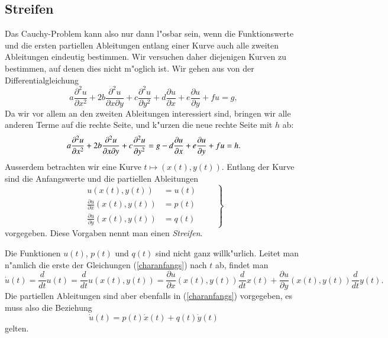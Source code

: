 \subsection{Streifen}
Das Cauchy-Problem kann also nur dann l"osbar sein, wenn die Funktionswerte
und die ersten partiellen Ableitungen entlang einer Kurve
auch alle zweiten Ableitungen eindeutig bestimmen.
Wir versuchen daher
diejenigen Kurven zu bestimmen, auf denen dies nicht m"oglich ist.
Wir gehen aus von der Differentialgleichung
\begin{equation}
a\frac{\partial^2 u}{\partial x^2}
+
2b\frac{\partial^2 u}{\partial x\partial y}
+
c\frac{\partial^2 u}{\partial y^2}
+
d\frac{\partial u}{\partial x}
+
e\frac{\partial u}{\partial y}
+
fu
=g,
\label{charequation}
\end{equation}
Da wir vor allem an den zweiten Ableitungen interessiert sind, bringen
wir alle anderen Terme auf die rechte Seite, und k"urzen die neue
rechte Seite mit $h$ ab:
\begin{equation}
a\frac{\partial^2 u}{\partial x^2}
+
2b\frac{\partial^2 u}{\partial x\partial y}
+
c\frac{\partial^2 u}{\partial y^2}
=
g
-
d\frac{\partial u}{\partial x}
+
e\frac{\partial u}{\partial y}
+
fu
=h.
\notag
\end{equation}
Ausserdem betrachten wir eine Kurve
$t\mapsto(x(t),y(t))$.
Entlang der Kurve sind die Anfangswerte
und die partiellen Ableitungen
\begin{equation}
\left.
\begin{aligned}
u(x(t),y(t))&=u(t)\\
\frac{\partial u}{\partial x}(x(t),y(t)) &= p(t)\\
\frac{\partial u}{\partial y}(x(t),y(t)) &= q(t)
\end{aligned}
\qquad
\right\}
\label{charanfangs}
\end{equation}
vorgegeben. Diese Vorgaben nennt man einen {\em Streifen}.

Die Funktionen $u(t)$, $p(t)$ und $q(t)$ sind nicht ganz willk"urlich.
Leitet man n"amlich die erste der Gleichungen (\ref{charanfangs}) nach
$t$ ab, findet man
\[
\dot{u}(t)=\frac{d}{dt}u(t)
=
\frac{d}{dt}u(x(t),y(t))
=
\frac{\partial u}{\partial x}(x(t), y(t))\frac{d}{dt}x(t)
+
\frac{\partial u}{\partial y}(x(t), y(t))\frac{d}{dt}y(t).
\]
Die partiellen Ableitungen sind aber ebenfalls in (\ref{charanfangs})
vorgegeben, es muss also die Beziehung
\begin{equation}
\dot{u}(t)= p(t)\dot{x}(t) + q(t)\dot{y}(t)
\label{cauchydatarestriction}
\end{equation}
gelten.

